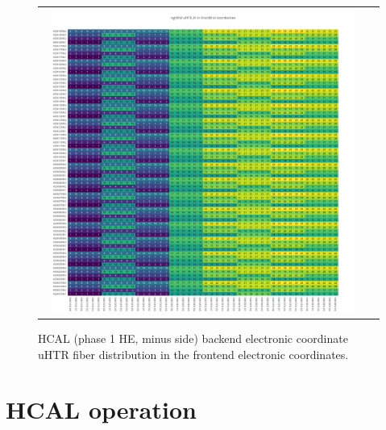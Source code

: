 \clearpage
\begin{figure}[htb]
 \begin{center}
  \begin{tabular}{cc}
   \includegraphics[angle=0,width=0.95\textwidth]{figures/appendix/ngHEM_uHTR_FI_in_FrontEnd.png}
  \end{tabular}
  \caption{HCAL (phase 1 HE, minus side) backend electronic coordinate uHTR fiber distribution in the frontend electronic coordinates.}
  \label{fig:lmapngHEMuHTRFIFEC}
 \end{center}
\end{figure}

\section{HCAL operation}
